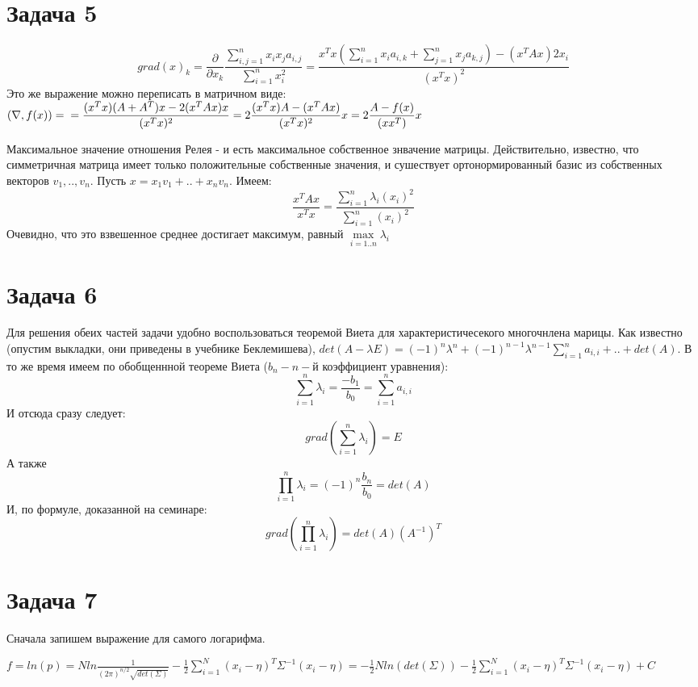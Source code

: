 \documentclass{article}
\begin{document}
\section{Задача 5} $$grad(x)_k = \frac{\partial }{\partial x_k} 
\frac{\sum\limits_{i, j = 1}^nx_ix_ja_{i, j}}{\sum\limits_{i = 1}^nx_i^2} = 
\frac{x^Tx(\sum\limits_{i = 1}^nx_ia_{i, k} + \sum\limits_{j = 1}^nx_ja_{k, j})
- (x^TAx)2x_i}{(x^Tx)^2}$$
Это же выражение можно переписать в матричном виде:
$\displaystyle (\nabla, f(x)) = \\ = \frac {(x^Tx)(A + A^T)x - 2(x^TAx)x}{(x^Tx)^2} =
2\frac {(x^Tx)A - (x^TAx)}{(x^Tx)^2}x = 
2\frac{A - f(x) }{(xx^T)}x
$

Максимальное значение отношения Релея - и есть максимальное собственное знвачение матрицы. Действительно, известно, что симметричная матрица имеет только положительные собственные значения, и сушествует ортонормированный базис из собственных векторов $v_1, .. , v_n$. Пусть $x = x_1v_1 + .. + x_nv_n$.  Имеем:
$$ \frac{x^TAx}{x^Tx} = \frac{\sum\limits_{i = 1}^n \lambda_i(x_i)^2}{\sum\limits_{i = 1}^n (x_i)^2}$$ Очевидно, что это взвешенное среднее достигает максимум, равный $\max\limits_{i = 1 .. n} \lambda_i$

\section{Задача 6}
Для решения обеих частей задачи удобно воспользоваться теоремой Виета для характеристичесекого многочнлена марицы. Как известно (опустим выкладки, они приведены в учебнике Беклемишева), $det(A - \lambda E) = 
(-1)^n\lambda^n + (-1)^{n - 1}\lambda^{n - 1}\sum\limits_{i = 1}^na_{i, i} + .. +
det(A).
$ В то же время имеем по обобщеннной теореме Виета ($b_n - n-$й коэффициент уравнения):
$$ \sum\limits_{i = 1}^n \lambda_i = \frac{-b_1}{b_0} =
\sum\limits_{i = 1}^na_{i, i}
$$
И отсюда сразу следует:
$$ grad(\sum\limits_{i = 1}^n \lambda_i) = E$$
А также 
$$ \prod\limits_{i = 1}^n \lambda_i = (-1)^n\frac{b_n}{b_0} = det(A)$$
И, по формуле, доказанной на семинаре:
$$ grad( \prod\limits_{i = 1}^n \lambda_i) = det(A)(A^{-1})^T$$
\section{Задача 7}
Сначала запишем выражение для самого логарифма.

$\displaystyle f =  ln(p) = Nln\frac{1}{(2\pi)^{n/2}\sqrt{det(\Sigma)}} - \frac{1}{2}
\sum\limits_{i = 1}^N(x_i - \eta)^T\Sigma^{-1}(x_i - \eta) = 
 -\frac{1}{2}Nln(det(\Sigma)) - \frac{1}{2}
\sum\limits_{i = 1}^N(x_i - \eta)^T\Sigma^{-1}(x_i - \eta) + C 
$
\end{document}

